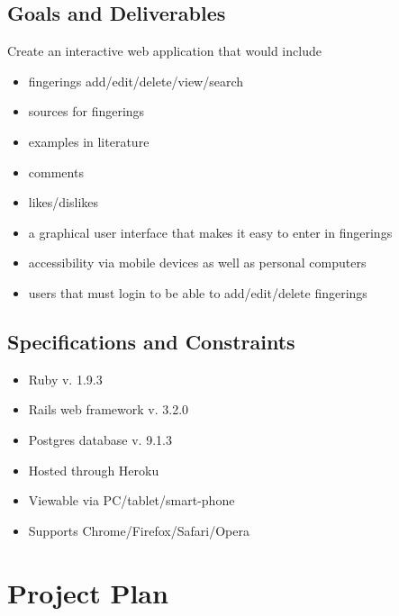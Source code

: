 \documentclass[12pt,english]{article}
\begin{document}
\subsection{Goals and Deliverables}

Create an interactive web application that would include 
\begin{itemize}
\item fingerings add/edit/delete/view/search 
\item sources for fingerings 
\item examples in literature 
\item comments 
\item likes/dislikes 
\item a graphical user interface that makes it easy to enter in fingerings 
\item accessibility via mobile devices as well as personal computers 
\item users that must login to be able to add/edit/delete fingerings 
\end{itemize}

\subsection{Specifications and Constraints}
\begin{itemize}
\item Ruby v. 1.9.3 
\item Rails web framework v. 3.2.0 
\item Postgres database v. 9.1.3 
\item Hosted through Heroku 
\item Viewable via PC/tablet/smart-phone 
\item Supports Chrome/Firefox/Safari/Opera 
\end{itemize}

\clearpage
\section{Project Plan}
\end{document}
